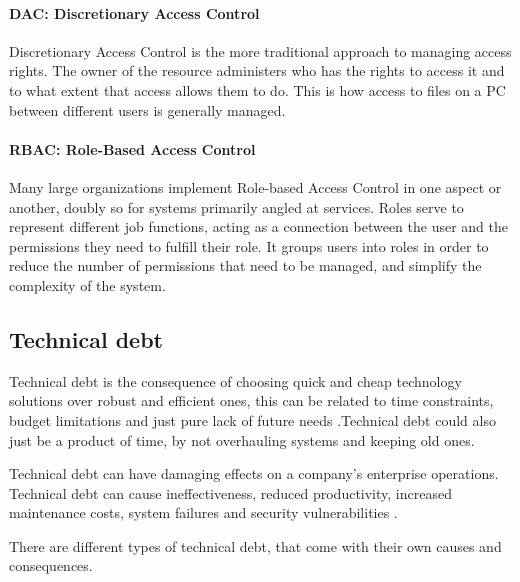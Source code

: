 \paragraph{DAC: Discretionary Access Control}
Discretionary Access Control is the more traditional approach to managing access rights. The owner of the resource administers who has the rights to access it and to what extent that access allows them to do. This is how access to files on a PC between different users is generally managed.

\paragraph{RBAC: Role-Based Access Control}
Many large organizations implement Role-based Access Control in one aspect or another\citep{RoleEngMethStd}, doubly so for systems primarily angled at services\citep{FormNormRBAC2009}. Roles serve to represent different job functions, acting as a connection between the user and the permissions they need to fulfill their role. It groups users into roles in order to reduce the number of permissions that need to be managed, and simplify the complexity of the system.


\subsection{Technical debt}
Technical debt is the consequence of choosing quick and cheap technology solutions over robust and efficient ones, this can be related to time constraints, budget limitations and just pure lack of future needs \citep{TechinicalDebtOUTsystem}.Technical debt could also just be a product of time, by not overhauling systems and keeping old ones.

Technical debt can have damaging effects on a company's enterprise operations. Technical debt can cause ineffectiveness, reduced productivity, increased maintenance costs, system failures and security vulnerabilities \citep{TechinicalDebtOUTsystem}.

There are different types of technical debt, that come with their own causes and consequences.

